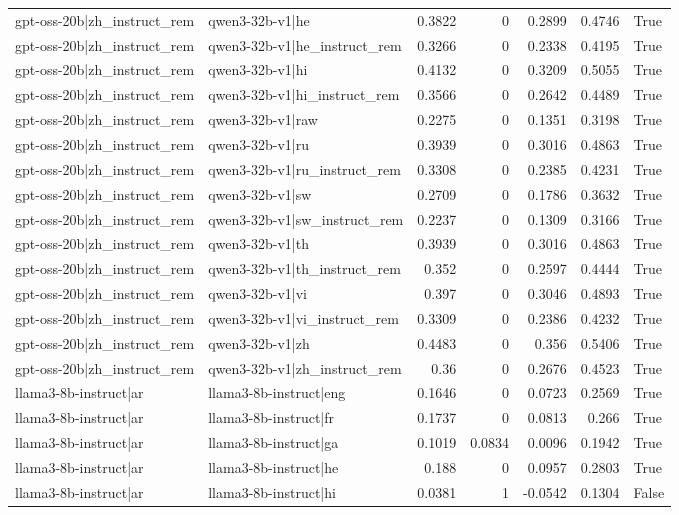 \begin{table}
\begin{tabular}{l l r r r r l}
gpt-oss-20b|zh_instruct_rem & qwen3-32b-v1|he & 0.3822 & 0 & 0.2899 & 0.4746 & True \\
gpt-oss-20b|zh_instruct_rem & qwen3-32b-v1|he_instruct_rem & 0.3266 & 0 & 0.2338 & 0.4195 & True \\
gpt-oss-20b|zh_instruct_rem & qwen3-32b-v1|hi & 0.4132 & 0 & 0.3209 & 0.5055 & True \\
gpt-oss-20b|zh_instruct_rem & qwen3-32b-v1|hi_instruct_rem & 0.3566 & 0 & 0.2642 & 0.4489 & True \\
gpt-oss-20b|zh_instruct_rem & qwen3-32b-v1|raw & 0.2275 & 0 & 0.1351 & 0.3198 & True \\
gpt-oss-20b|zh_instruct_rem & qwen3-32b-v1|ru & 0.3939 & 0 & 0.3016 & 0.4863 & True \\
gpt-oss-20b|zh_instruct_rem & qwen3-32b-v1|ru_instruct_rem & 0.3308 & 0 & 0.2385 & 0.4231 & True \\
gpt-oss-20b|zh_instruct_rem & qwen3-32b-v1|sw & 0.2709 & 0 & 0.1786 & 0.3632 & True \\
gpt-oss-20b|zh_instruct_rem & qwen3-32b-v1|sw_instruct_rem & 0.2237 & 0 & 0.1309 & 0.3166 & True \\
gpt-oss-20b|zh_instruct_rem & qwen3-32b-v1|th & 0.3939 & 0 & 0.3016 & 0.4863 & True \\
gpt-oss-20b|zh_instruct_rem & qwen3-32b-v1|th_instruct_rem & 0.352 & 0 & 0.2597 & 0.4444 & True \\
gpt-oss-20b|zh_instruct_rem & qwen3-32b-v1|vi & 0.397 & 0 & 0.3046 & 0.4893 & True \\
gpt-oss-20b|zh_instruct_rem & qwen3-32b-v1|vi_instruct_rem & 0.3309 & 0 & 0.2386 & 0.4232 & True \\
gpt-oss-20b|zh_instruct_rem & qwen3-32b-v1|zh & 0.4483 & 0 & 0.356 & 0.5406 & True \\
gpt-oss-20b|zh_instruct_rem & qwen3-32b-v1|zh_instruct_rem & 0.36 & 0 & 0.2676 & 0.4523 & True \\
llama3-8b-instruct|ar & llama3-8b-instruct|eng & 0.1646 & 0 & 0.0723 & 0.2569 & True \\
llama3-8b-instruct|ar & llama3-8b-instruct|fr & 0.1737 & 0 & 0.0813 & 0.266 & True \\
llama3-8b-instruct|ar & llama3-8b-instruct|ga & 0.1019 & 0.0834 & 0.0096 & 0.1942 & True \\
llama3-8b-instruct|ar & llama3-8b-instruct|he & 0.188 & 0 & 0.0957 & 0.2803 & True \\
llama3-8b-instruct|ar & llama3-8b-instruct|hi & 0.0381 & 1 & -0.0542 & 0.1304 & False \\

\end{tabular}
\end{table}
